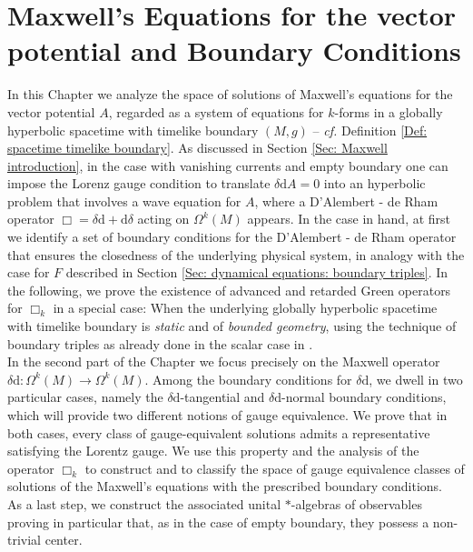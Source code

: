 \chapter{Maxwell's Equations for the vector potential and Boundary Conditions}\label{Chapter3}



In this Chapter we analyze the space of solutions of Maxwell's equations for the vector potential $A$, regarded as a system of equations for $k$-forms in a globally hyperbolic spacetime with timelike boundary $(M,g)$ -- \emph{cf.} Definition \ref{Def: spacetime timelike boundary}. As discussed in Section \ref{Sec: Maxwell introduction}, in the case with vanishing currents and empty boundary one can impose the Lorenz gauge condition to translate $\delta\mathrm{d}A=0$ into an hyperbolic problem that involves a wave equation for $A$, where a D'Alembert - de Rham operator $\Box=\delta \mathrm{d}+\mathrm{d}\delta$ acting on $\Omega^k(M)$ appears. In the case in hand, at first we identify a set of boundary conditions for the D'Alembert - de Rham operator that ensures the closedness of the underlying physical system, in analogy with the case for $F$ described in Section \ref{Sec: dynamical equations: boundary triples}. In the following, we prove the existence of advanced and retarded Green operators for $\Box_k$ in a special case: When the underlying globally hyperbolic spacetime with timelike boundary is \emph{static} and of \emph{bounded geometry}, using the technique of boundary triples as already done in the scalar case in \cite{Dappiaggi-Drago-Ferreira-19}.\\

In the second part of the Chapter we focus precisely on the Maxwell operator $\delta\mathrm{d}\colon\Omega^k(M)\to\Omega^k(M)$.
Among the boundary conditions for $\delta\mathrm{d}$, we dwell in two particular cases, namely the $\delta\mathrm{d}$-tangential and $\delta\mathrm{d}$-normal boundary conditions, which will provide two different notions of gauge equivalence. We prove that in both cases, every class of gauge-equivalent solutions admits a representative satisfying the Lorentz gauge. We use this property and the analysis of the operator $\Box_k$ to construct and to classify the space of gauge
equivalence classes of solutions of the Maxwell’s equations with the prescribed boundary conditions.\\
As a last step, we construct the associated unital $\ast$-algebras of observables proving in particular that, as in the case of empty boundary, they possess a non-trivial center.




